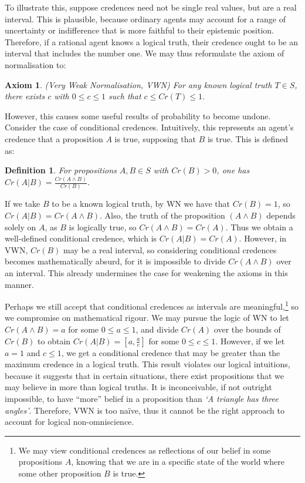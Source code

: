 \documentclass[12pt]{article}
\newtheorem{definition}{Definition}
\newtheorem{axiom}{Axiom}
\begin{document}
To illustrate this, suppose credences need not be single real values, but are a real interval. This is plausible, because ordinary agents may account for a range of uncertainty or indifference that is more faithful to their epistemic position. Therefore, if a rational agent knows a logical truth, their credence ought to be an interval that includes the number one.\autocite{sep} We may thus reformulate the axiom of normalisation to:
\begin{axiom}
    (Very Weak Normalisation, VWN) For any known logical truth $T\in S$, there exists $c$ with $0\leq c\leq 1$ such that $c\leq Cr(T)\leq1$.
\end{axiom}
However, this causes some useful results of probability to become undone. Consider the case of conditional credences. Intuitively, this represents an agent's credence that a proposition $A$ is true, supposing that $B$ is true.\autocite[32]{bdrc} This is defined as:
\begin{definition}
    For propositions $A,B\in S$ with $Cr(B)>0$, one has $Cr(A|B)=\frac{Cr(A\land B)}{Cr(B)}$.
\end{definition}
If we take $B$ to be a known logical truth, by WN we have that $Cr(B)=1$, so $Cr(A|B)=Cr(A\land B)$. Also, the truth of the proposition $(A\land B)$ depends solely on $A$, as $B$ is logically true, so $Cr(A\land B)=Cr(A)$. Thus we obtain a well-defined conditional credence, which is $Cr(A|B)=Cr(A)$. However, in VWN, $Cr(B)$ may be a real interval, so considering conditional credences becomes mathematically absurd, for it is impossible to divide $Cr(A\land B)$ over an interval. This already undermines the case for weakening the axioms in this manner.

Perhaps we still accept that conditional credences as intervals are meaningful,\footnote{We may view conditional credences as reflections of our belief in some propositions $A$, knowing that we are in a specific state of the world where some other proposition $B$ is true.} so we compromise on mathematical rigour. We may pursue the logic of WN to let $Cr(A\land B)=a$ for some $0\leq a\leq1$, and divide $Cr(A)$ over the bounds of $Cr(B)$ to obtain $Cr(A|B)=[a,\frac{a}{c}]$ for some $0\leq c\leq1$. However, if we let $a=1$ and $c\leq 1$, we get a conditional credence that may be greater than the maximum credence in a logical truth. This result violates our logical intuitions, because it suggests that in certain situations, there exist propositions that we may believe in more than logical truths. It is inconceivable, if not outright impossible, to have ``more'' belief in a proposition than \textit{`A triangle has three angles'}. Therefore, VWN is too na\"ive, thus it cannot be the right approach to account for logical non-omniscience.
\end{document}
